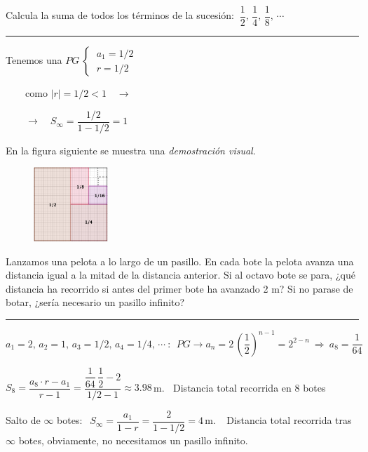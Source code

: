 \begin{miejercicio}

Calcula la suma de todos los términos de la sucesión: $\ \dfrac 1 2, \, \dfrac 1 4, \, \dfrac 18, \, \cdots$	


\rule{250pt}{0.1pt}
\vspace{2mm} 

\begin{multicols}{2}
Tenemos una $PG \ \begin{cases} \ a_1=1/2 \\ \ r=1/2 \end{cases}$

$\qquad \text{como } |r|=1/2<1 \quad \to$

$\qquad \to  \quad S_\infty=\dfrac{1/2}{1-1/2}=1$


En la figura siguiente se muestra una \emph{demostración visual}.

\begin{figure}[H]
	\centering
	\includegraphics[width=0.25\textwidth]{img-suc/suc03.png}
\end{figure}
\end{multicols}
\end{miejercicio}
\vspace{1.5cm}%
\begin{miejercicio}

Lanzamos una pelota a lo largo de un pasillo. En cada bote la pelota avanza una distancia igual a la mitad de la distancia anterior. Si al octavo bote se para, ¿qué distancia ha recorrido si antes del primer bote ha avanzado 2 m? Si no parase de botar, ¿sería necesario un pasillo infinito?

\rule{250pt}{0.1pt}
\vspace{2mm} 

$a_1=2,\, a_2=1,\, a_3=1/2,\, a_4=1/4,\,  \cdots \ :\ \ PG \to a_n=2\, \left(\dfrac 1 2\right)^{n-1}=2^{2-n} \ \Rightarrow \ a_8=\dfrac 1{64}$

\vspace{2mm} $S_8=\dfrac{a_8\cdot r -a_1}{r -1 }=\dfrac{\dfrac 1{64} \, \dfrac 1 2-2 }{1/2-1} \approx 3.98 \,  $m. $\ $ Distancia total recorrida en 8 botes

\vspace{4mm} Salto de $\infty$ botes: $\ \ S_\infty=\dfrac{a_1}{1-r}=\dfrac{2}{1-1/2}=4\, $m. $\ \ $ Distancia total recorrida tras $\infty$ botes, obviamente, no necesitamos un pasillo infinito.

	
\end{miejercicio}

